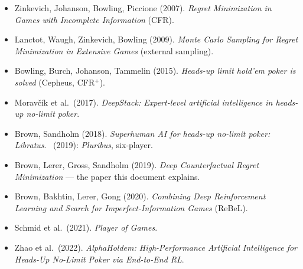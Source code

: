\documentclass[11pt,a4paper]{article}
\begin{document}
\begin{itemize}[leftmargin=1.4em, itemsep=1pt]
\item Zinkevich, Johanson, Bowling, Piccione (2007). \emph{Regret Minimization
  in Games with Incomplete Information} (CFR).
\item Lanctot, Waugh, Zinkevich, Bowling (2009). \emph{Monte Carlo Sampling for
  Regret Minimization in Extensive Games} (external sampling).
\item Bowling, Burch, Johanson, Tammelin (2015). \emph{Heads-up limit hold'em
  poker is solved} (Cepheus, CFR$^{+}$).
\item Morav\v{c}\'{i}k et al.\ (2017). \emph{DeepStack: Expert-level artificial
  intelligence in heads-up no-limit poker}.
\item Brown, Sandholm (2018). \emph{Superhuman AI for heads-up no-limit poker:
  Libratus}. \ (2019): \emph{Pluribus}, six-player.
\item Brown, Lerer, Gross, Sandholm (2019). \emph{Deep Counterfactual Regret
  Minimization} --- the paper this document explains.
\item Brown, Bakhtin, Lerer, Gong (2020). \emph{Combining Deep Reinforcement
  Learning and Search for Imperfect-Information Games} (ReBeL).
\item Schmid et al.\ (2021). \emph{Player of Games}.
\item Zhao et al.\ (2022). \emph{AlphaHoldem: High-Performance Artificial
  Intelligence for Heads-Up No-Limit Poker via End-to-End RL}.
\end{itemize}
\end{document}
